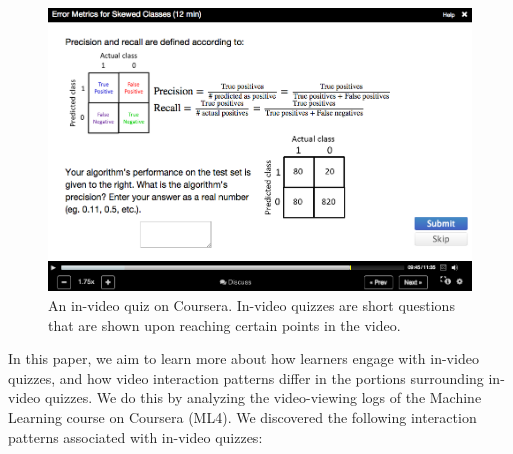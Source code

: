 \documentclass{sigchi}
\begin{document}
\begin{figure}
\includegraphics[width=1.0\columnwidth]{coursera}
\caption{An in-video quiz on Coursera. In-video quizzes are short questions that are shown upon reaching certain points in the video.}
\label{fig:coursera}
\end{figure}

In this paper, we aim to learn more about how learners engage with in-video quizzes, and how video interaction patterns differ in the portions surrounding in-video quizzes. We do this by analyzing the video-viewing logs of the Machine Learning course on Coursera (ML4). We discovered the following interaction patterns associated with in-video quizzes:

\end{document}
